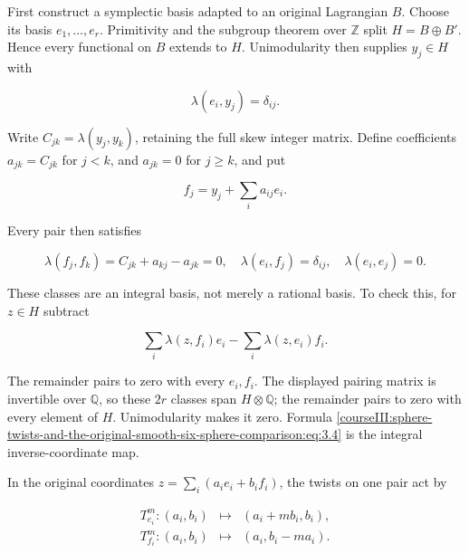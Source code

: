 First construct a symplectic basis adapted to an original Lagrangian \(B\). Choose its basis \(e_1,\ldots,e_r\). Primitivity and the subgroup theorem over \(\mathbb Z\) split \(H=B\oplus B'\). Hence every functional on \(B\) extends to \(H\). Unimodularity then supplies \(y_j\in H\) with

\begin{equation}
\lambda(e_i,y_j)=\delta_{ij}.
 \label{courseIII:sphere-twists-and-the-original-smooth-six-sphere-comparison:eq:3.1}
\end{equation}

Write \(C_{jk}=\lambda(y_j,y_k)\), retaining the full skew integer matrix. Define coefficients \(a_{jk}=C_{jk}\) for \(j<k\), and \(a_{jk}=0\) for \(j\ge k\), and put

\begin{equation}
f_j=y_j+\sum_i a_{ij}e_i .
 \label{courseIII:sphere-twists-and-the-original-smooth-six-sphere-comparison:eq:3.2}
\end{equation}

Every pair then satisfies

\begin{equation}
\lambda(f_j,f_k)=C_{jk}+a_{kj}-a_{jk}=0,\quad
 \lambda(e_i,f_j)=\delta_{ij},\quad
 \lambda(e_i,e_j)=0 .
 \label{courseIII:sphere-twists-and-the-original-smooth-six-sphere-comparison:eq:3.3}
\end{equation}

These classes are an integral basis, not merely a rational basis. To check this, for \(z\in H\) subtract

\begin{equation}
\sum_i\lambda(z,f_i)e_i
                       -\sum_i\lambda(z,e_i)f_i .
 \label{courseIII:sphere-twists-and-the-original-smooth-six-sphere-comparison:eq:3.4}
\end{equation}

The remainder pairs to zero with every \(e_i,f_i\). The displayed pairing matrix is invertible over \(\mathbb Q\), so these \(2r\) classes span \(H\otimes\mathbb Q\); the remainder pairs to zero with every element of \(H\). Unimodularity makes it zero. Formula \eqref{courseIII:sphere-twists-and-the-original-smooth-six-sphere-comparison:eq:3.4} is the integral inverse-coordinate map.

In the original coordinates \(z=\sum_i(a_ie_i+b_if_i)\), the twists on one pair act by

\begin{equation}
\begin{array}{rcl}
 T_{e_i}^{m}:(a_i,b_i)&\longmapsto&(a_i+mb_i,b_i),\\
 T_{f_i}^{m}:(a_i,b_i)&\longmapsto&(a_i,b_i-ma_i).
 \end{array}
 \label{courseIII:sphere-twists-and-the-original-smooth-six-sphere-comparison:eq:3.5}
\end{equation}

